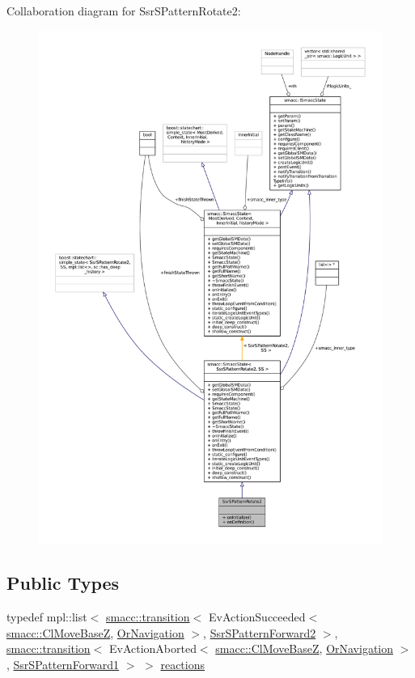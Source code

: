 Collaboration diagram for Ssr\+S\+Pattern\+Rotate2\+:
\nopagebreak
\begin{figure}[H]
\begin{center}
\leavevmode
\includegraphics[width=350pt]{structSsrSPatternRotate2__coll__graph}
\end{center}
\end{figure}
\subsection*{Public Types}
\begin{DoxyCompactItemize}
\item 
typedef mpl\+::list$<$ \hyperlink{classsmacc_1_1transition}{smacc\+::transition}$<$ Ev\+Action\+Succeeded$<$ \hyperlink{classsmacc_1_1ClMoveBaseZ}{smacc\+::\+Cl\+Move\+BaseZ}, \hyperlink{classOrNavigation}{Or\+Navigation} $>$, \hyperlink{structSsrSPatternForward2}{Ssr\+S\+Pattern\+Forward2} $>$, \hyperlink{classsmacc_1_1transition}{smacc\+::transition}$<$ Ev\+Action\+Aborted$<$ \hyperlink{classsmacc_1_1ClMoveBaseZ}{smacc\+::\+Cl\+Move\+BaseZ}, \hyperlink{classOrNavigation}{Or\+Navigation} $>$, \hyperlink{structSsrSPatternForward1}{Ssr\+S\+Pattern\+Forward1} $>$ $>$ \hyperlink{structSsrSPatternRotate2_aec40f8fec6467ee60f0aecd09936d68f}{reactions}
\end{DoxyCompactItemize}
